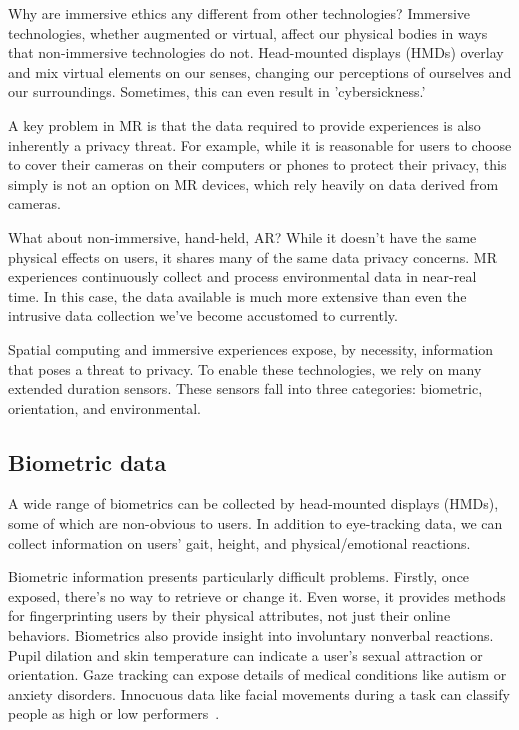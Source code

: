 Why are immersive ethics any different from other technologies? Immersive technologies, whether augmented or virtual, affect our physical bodies in ways that non-immersive technologies do not. Head-mounted displays (HMDs) overlay and mix virtual elements on our senses, changing our perceptions of ourselves and our surroundings. Sometimes, this can even result in 'cybersickness.'

A key problem in MR is that the data required to provide experiences is also inherently a privacy threat. For example, while it is reasonable for users to choose to cover their cameras on their computers or phones to protect their privacy, this simply is not an option on MR devices, which rely heavily on data derived from cameras.

What about non-immersive, hand-held, AR? While it doesn't have the same physical effects on users, it shares many of the same data privacy concerns. MR experiences continuously collect and process environmental data in near-real time. In this case, the data available is much more extensive than even the intrusive data collection we've become accustomed to currently.

Spatial computing and immersive experiences expose, by necessity, information that poses a threat to privacy. To enable these technologies, we rely on many extended duration sensors. These sensors fall into three categories: biometric, orientation, and environmental.

\subsection{Biometric data}\label{sec:biometrics}
A wide range of biometrics can be collected by head-mounted displays (HMDs), some of which are non-obvious to users. In addition to eye-tracking data, we can collect information on users' gait, height, and physical/emotional reactions.

Biometric information presents particularly difficult problems. Firstly, once exposed, there's no way to retrieve or change it. Even worse, it provides methods for fingerprinting users by their physical attributes, not just their online behaviors. Biometrics also provide insight into involuntary nonverbal reactions\cite{bailenson2018protecting}. Pupil dilation and skin temperature can indicate a user's sexual attraction or orientation. Gaze tracking can expose details of medical conditions like autism or anxiety disorders. Innocuous data like facial movements during a task can classify people as high or low performers~\cite{jabon2011automatically}.

